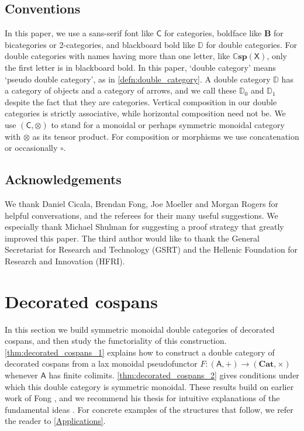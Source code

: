 \documentclass[a4paper,onecolumn, superscriptaddress,10pt, accepted=2022-03-25, issue=SS, volume=VV, shorttitle=papers/compositionality-VV-SS]{compositionalityarticle}
\let\maps\colon
\newcommand{\A}{\mathsf{A}}
\newcommand{\C}{\mathsf{C}}
\newcommand{\X}{\mathsf{X}}
\newcommand{\bicat}{\mathbf}
\newcommand{\Cat}{\bicat{Cat}}
\newcommand{\double}[1]{\mathbf{\mathbb #1}}
\newcommand{\lCsp}{\double{Csp}}
\newcommand{\lD}{\double{D}}
\begin{document}
\subsection*{Conventions}

In this paper, we use a sans-serif font like $\C$ for categories, boldface like $\mathbf{B}$ for bicategories or 2-categories, and blackboard bold like $\lD$ for double categories. For double categories with names having more than one letter, like $\lCsp(\X)$, only the first letter is in 
blackboard bold. In this paper, `double category' means `pseudo double category', as in \cref{defn:double_category}. A double category $\lD$ has a category of objects and a category of arrows, and we call these $\lD_0$ and $\lD_1$ despite the fact that they are categories. Vertical composition in our double categories is strictly associative, while horizontal composition need not be.  We use $(\C,\otimes)$ to stand for a monoidal or perhaps symmetric monoidal category with $\otimes$ as its tensor product.  For composition or morphisms we use concatenation or occasionally $\circ$.

\subsection*{Acknowledgements}

We thank Daniel Cicala, Brendan Fong, Joe Moeller and Morgan Rogers for helpful conversations, and the referees for their many useful suggestions.  We especially thank Michael Shulman for suggesting a proof strategy that greatly improved this paper.   The third author would like to thank the General Secretariat for Research  and Technology (GSRT) and the Hellenic Foundation for Research and Innovation (HFRI).

\section{Decorated cospans}\label{DecCospansDoubleCat}

In this section we build symmetric monoidal double categories of decorated cospans, and then study the functoriality of this construction.   
\cref{thm:decorated_cospans_1} explains how to construct a double category of decorated cospans from a lax monoidal pseudofunctor $F \maps (\A,+) \to 
(\Cat, \times)$ whenever $\A$ has finite colimits.  \cref{thm:decorated_cospans_2} gives conditions under which this double category is symmetric 
monoidal.   These results build on earlier work of Fong \cite{Fong}, and we recommend his thesis for intuitive explanations of the fundamental ideas 
\cite{FongThesis}. For concrete examples of the structures that follow, we refer the reader to \cref{Applications}.
\end{document}
